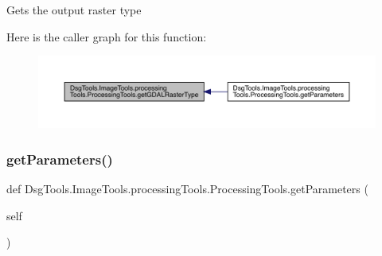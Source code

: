 \begin{DoxyVerb}Gets the output raster type
\end{DoxyVerb}
 Here is the caller graph for this function\+:
\nopagebreak
\begin{figure}[H]
\begin{center}
\leavevmode
\includegraphics[width=350pt]{class_dsg_tools_1_1_image_tools_1_1processing_tools_1_1_processing_tools_a3463e8196d90002c4324ebb84a8f5bc9_icgraph}
\end{center}
\end{figure}
\mbox{\label{class_dsg_tools_1_1_image_tools_1_1processing_tools_1_1_processing_tools_a07fd0be59b4c07136425c265f6f50a48}} 
\subsubsection{\texorpdfstring{get\+Parameters()}{getParameters()}}
{\footnotesize\ttfamily def Dsg\+Tools.\+Image\+Tools.\+processing\+Tools.\+Processing\+Tools.\+get\+Parameters (\begin{DoxyParamCaption}\item[{}]{self }\end{DoxyParamCaption})}

